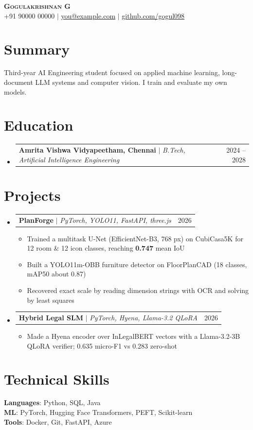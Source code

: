 \documentclass[letterpaper,11pt]{article}
\makeatletter
\newcommand{\resumeItem}[1]{\item\small{{#1 \vspace{-2pt}}}}
\newcommand{\resumeProjectHeading}[2]{
  \item
  \begin{tabular*}{0.97\textwidth}{l@{\extracolsep{\fill}}r}
    \small#1 & #2 \\
  \end{tabular*}\vspace{-7pt}
}
\newcommand{\resumeSubHeadingListStart}{\begin{itemize}[leftmargin=0.15in, label={}]}
\newcommand{\resumeSubHeadingListEnd}{\end{itemize}}
\newcommand{\resumeItemListStart}{\begin{itemize}}
\newcommand{\resumeItemListEnd}{\end{itemize}\vspace{-5pt}}
\makeatother
\begin{document}
\begin{center}
    \textbf{\Huge \scshape Gogulakrishnan G} \\ \vspace{1pt}
    \small +91 90000 00000 $|$ \href{mailto:you@example.com}{\underline{you@example.com}} $|$
    \href{https://github.com/gogul098}{\underline{github.com/gogul098}}
\end{center}

\section{Summary}
Third-year AI Engineering student focused on applied machine learning, long-document LLM systems and computer vision. I train and evaluate my own models.

\section{Education}
  \resumeSubHeadingListStart
    \resumeProjectHeading
      {\textbf{Amrita Vishwa Vidyapeetham, Chennai} $|$ \emph{B.Tech, Artificial Intelligence Engineering}}{2024 -- 2028}
  \resumeSubHeadingListEnd

\section{Projects}
    \resumeSubHeadingListStart
      \resumeProjectHeading
          {\textbf{PlanForge} $|$ \emph{PyTorch, YOLO11, FastAPI, three.js}}{2026}
          \resumeItemListStart
            \resumeItem{Trained a multitask U-Net (EfficientNet-B3, 768 px) on CubiCasa5K for 12 room \& 12 icon classes, reaching \textbf{0.747} mean IoU}
            \resumeItem{Built a YOLO11m-OBB furniture detector on FloorPlanCAD (18 classes, mAP50 about 0.87)}
            \resumeItem{Recovered exact scale by reading dimension strings with OCR and solving by least squares} %
          \resumeItemListEnd
      \resumeProjectHeading
          {\textbf{Hybrid Legal SLM} $|$ \emph{PyTorch, Hyena, Llama-3.2 QLoRA}}{2026}
          \resumeItemListStart
            \resumeItem{Made a Hyena encoder over InLegalBERT vectors with a Llama-3.2-3B QLoRA verifier; 0.635 micro-F1 vs 0.283 zero-shot}
          \resumeItemListEnd
    \resumeSubHeadingListEnd

\section{Technical Skills}
 \begin{itemize}[leftmargin=0.15in, label={}]
    \small{\item{
     \textbf{Languages}{: Python, SQL, Java} \\
     \textbf{ML}{: PyTorch, Hugging Face Transformers, PEFT, Scikit-learn} \\
     \textbf{Tools}{: Docker, Git, FastAPI, Azure}
    }}
 \end{itemize}
\end{document}
